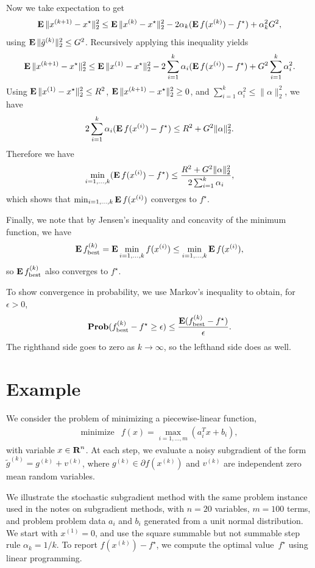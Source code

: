 \documentclass[12pt]{article}
\begin{document}
Now we take expectation to get
\[
\mathop{\bf E{}} \|x^{(k+1)}-x^\star\|_2^2
\leq \mathop{\bf E{}} \|x^{(k)}-x^\star\|_2^2
	    -2\alpha_k (\mathop{\bf E{}} f(x^{(k)})-f^\star)
	    +\alpha_k^2G^2,
\]
using $\mathop{\bf E{}} \|\tilde g^{(k)}\|_2^2 \leq G^2$.
Recursively applying this inequality yields
\[
\mathop{\bf E{}} \|x^{(k+1)}-x^\star\|_2^2 \leq
\mathop{\bf E{}}\|x^{(1)}-x^\star\|_2^2
-2\sum_{i=1}^k \alpha_i  (\mathop{\bf E{}} f(x^{(i)})-f^\star)
+G^2\sum_{i=1}^k \alpha_i^2.
\]
Using $\mathop{\bf E{}} \|x^{(1)}-x^\star\|_2^2 \leq R^2$,
$\mathop{\bf E{}} \|x^{(k+1)}-x^\star\|_2^2 \geq 0$, and $\sum_{i=1}^k \alpha_i^2
\leq \|\alpha \|_2^2$, we have
\[
2 \sum_{i=1}^k \alpha_i  (\mathop{\bf E{}} f(x^{(i)})-f^\star)
\leq R^2 +G^2\| \alpha \|_2^2.
\]
Therefore we have
\[
\min_{i=1,\ldots,k} (\mathop{\bf E{}} f(x^{(i)})-f^\star) \leq
\frac{R^2+G^2\|\alpha\|_2^2}{2 \sum_{i=1}^k \alpha_i},
\]
which shows that $\min_{i=1,\ldots,k} \mathop{\bf E{}} f(x^{(i)})$
converges to $f^\star$.

Finally, we note that
by Jensen's inequality and concavity of the minimum
function, we have
\[
\mathop{\bf E{}} f^{(k)}_\mathrm{best}
= \mathop{\bf E{}} \min_{i=1,\ldots,k} f(x^{(i)})
\leq \min_{i=1,\ldots,k} \mathop{\bf E{}} f(x^{(i)}),
\]
so $\mathop{\bf E{}} f^{(k)}_\mathrm{best}$ also converges to $f^\star$.

To show convergence in probability, we use
Markov's inequality to obtain, for $\epsilon>0$,
\[
\mathop{\bf Prob}(f^{(k)}_\mathrm{best} - f^\star \geq \epsilon) \leq
\frac{\mathop{\bf E{}} (f^{(k)}_\mathrm{best} - f^\star)}{\epsilon}.
\]
The righthand side goes to zero as $k \rightarrow \infty$, so
the lefthand side does as well.

\section{Example}

We consider the problem of minimizing a piecewise-linear function,
\[
\begin{array}{ll} \mbox{minimize} &
f(x) = \max_{i=1,\ldots,m} (a_i^T x + b_i),
\end{array}
\]
with variable $x \in {\mbox{\bf R}}^n$.
At each step, we evaluate a noisy subgradient of the form
$\tilde g^{(k)} = g^{(k)} + v^{(k)}$, where $g^{(k)}\in \partial
f(x^{(k)})$ and $v^{(k)}$ are independent zero mean random variables.

We illustrate the stochastic subgradient method with the same
problem instance used in the notes on subgradient methods,
with $n=20$ variables, $m=100$ terms, and problem
problem data $a_i$ and $b_i$ generated from a unit normal
distribution.  We start with $x^{(1)}=0$,
and use the square summable but not summable step rule
$\alpha_k=1/k$.
To report $f(x^{(k)})-f^\star$,
we compute the optimal value~$f^\star$ using linear programming.
\end{document}
